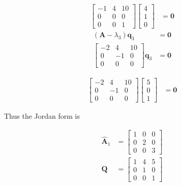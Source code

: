 \begin{itemize}
\begin{align*}
  \begin{bmatrix}
    -1 & 4 & 10 \\
     0 & 0 & 0 \\
    0 & 0 & 1
    \end{bmatrix}
    \begin{bmatrix}
     4 \\ 1 \\ 0
    \end{bmatrix}
    &= \mathbf{0}
\end{align*}
\begin{align*}
 (\mathbf{A}-\lambda_3) \mathbf{q}_3 &= \mathbf{0}\\
 \begin{bmatrix}
    -2 & 4 & 10 \\
     0 & -1 & 0 \\
    0 & 0 & 0
    \end{bmatrix}\mathbf{q}_3 &= \mathbf{0}
\end{align*}

\begin{align*}
  \begin{bmatrix}
    -2 & 4 & 10 \\
     0 & -1 & 0 \\
    0 & 0 & 0
    \end{bmatrix}
    \begin{bmatrix}
     5 \\ 0 \\ 1
    \end{bmatrix}
    &= \mathbf{0}
\end{align*}

Thus the Jordan form is

 \begin{align*}
 \hat{\mathbf{A}}_1 &= \begin{bmatrix}
                        1 & 0 &0\\0 & 2 & 0\\0 & 0&3
                       \end{bmatrix}\\
  \mathbf{Q} &= \begin{bmatrix}
   1 & 4 & 5\\
   0 & 1 & 0\\
   0 & 0 &1
  \end{bmatrix}
 \end{align*}



\end{itemize}
